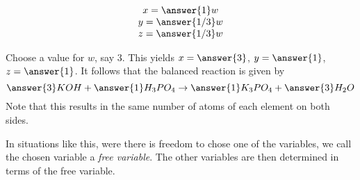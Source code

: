 \documentclass{ximera}
\begin{document}
\begin{exploration}
\begin{example}
\begin{solution}
  \begin{equation*}
    \begin{array}{c}
      x = \answer{1}w \\
      y = \answer{1/3}w \\
      z = \answer{1/3}w \\
    \end{array}
  \end{equation*}

  Choose a value for $w$, say $3$. This yields $x=\answer{3}$, $y=\answer{1}$, $z=\answer{1}$. It follows that the balanced reaction is given by
  \begin{equation*}
    \answer{3}KOH+\answer{1}H_3PO_4\rightarrow \answer{1}K_3PO_4+\answer{3}H_2O
  \end{equation*}
  Note that this results in the same number of atoms of each element
  on both sides.


\begin{remark}

  In situations like this, were there is freedom to chose one of the variables, we call the chosen variable a \emph{free variable}. The other variables are then determined in terms of the free variable.

\end{remark}

\end{solution}

\end{example}

\end{exploration}
\end{document}
